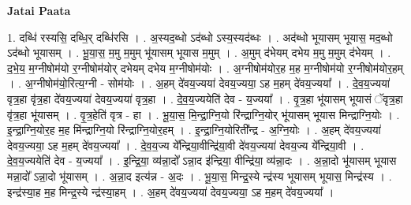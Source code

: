 \documentclass[17pt]{extarticle}
\begin{document}
\textbf{Jatai Paata} \newline

1. दब्धि॑ रस्यसि॒ दब्धि॒र् दब्धि॑रसि । . अ॒स्यद॒ब्धो ऽद॑ब्धो ऽस्य॒स्यद॑ब्धः । . अद॑ब्धो भूयासम् भूयास॒ मद॒ब्धो ऽद॑ब्धो भूयासम् । . भू॒या॒स॒ म॒मु म॒मुम् भू॑यासम् भूयास म॒मुम् । . अ॒मुम् द॑भेयम् दभेय म॒मु म॒मुम् द॑भेयम् । . द॒भे॒य॒ म॒ग्नीषोम॑यो र॒ग्नीषोम॑योर् दभेयम् दभेय म॒ग्नीषोम॑योः । . अ॒ग्नीषोम॑योर॒ह म॒ह म॒ग्नीषोम॑यो र॒ग्नीषोम॑योर॒हम् । . अ॒ग्नीषोम॑यो॒रित्य॒ग्नी - सोम॑योः । . अ॒हम् दे॑वय॒ज्यया॑ देवय॒ज्यया॒ ऽह म॒हम् दे॑वय॒ज्यया᳚ । . दे॒व॒य॒ज्यया॑ वृत्र॒हा वृ॑त्र॒हा दे॑वय॒ज्यया॑ देवय॒ज्यया॑ वृत्र॒हा । . दे॒व॒य॒ज्ययेति॑ देव - य॒ज्यया᳚ । . वृ॒त्र॒हा भू॑यासम् भूयासं ॅवृत्र॒हा वृ॑त्र॒हा भू॑यासम् । . वृ॒त्र॒हेति॑ वृत्र - हा । . भू॒या॒स॒ मि॒न्द्रा॒ग्नि॒यो रि॑न्द्राग्नि॒योर् भू॑यासम् भूयास मिन्द्राग्नि॒योः । . इ॒न्द्रा॒ग्नि॒योर॒ह म॒ह मि॑न्द्राग्नि॒यो रि॑न्द्राग्नि॒योर॒हम् । . इ॒न्द्रा॒ग्नि॒योरिती᳚न्द्र - अ॒ग्नि॒योः । . अ॒हम् दे॑वय॒ज्यया॑ देवय॒ज्यया॒ ऽह म॒हम् दे॑वय॒ज्यया᳚ । . दे॒व॒य॒ज्य ये᳚न्द्रिया॒वीन्द्रि॑या॒वी दे॑वय॒ज्यया॑ देवय॒ज्य ये᳚न्द्रिया॒वी । . दे॒व॒य॒ज्ययेति॑ देव - य॒ज्यया᳚ । . इ॒न्द्रि॒या॒ व्य॑न्ना॒दो᳚ ऽन्ना॒द इ॑न्द्रिया॒ वीन्द्रि॑या॒ व्य॑न्ना॒दः । . अ॒न्ना॒दो भू॑यासम् भूयास मन्ना॒दो᳚ ऽन्ना॒दो भू॑यासम् । . अ॒न्ना॒द इत्य॑न्न - अ॒दः । . भू॒या॒स॒ मिन्द्र॒स्ये न्द्र॑स्य भूयासम् भूयास॒ मिन्द्र॑स्य । . इन्द्र॑स्या॒ह म॒ह मिन्द्र॒स्ये न्द्र॑स्या॒हम् । . अ॒हम् दे॑वय॒ज्यया॑ देवय॒ज्यया॒ ऽह म॒हम् दे॑वय॒ज्यया᳚ । \newline
\end{document}

